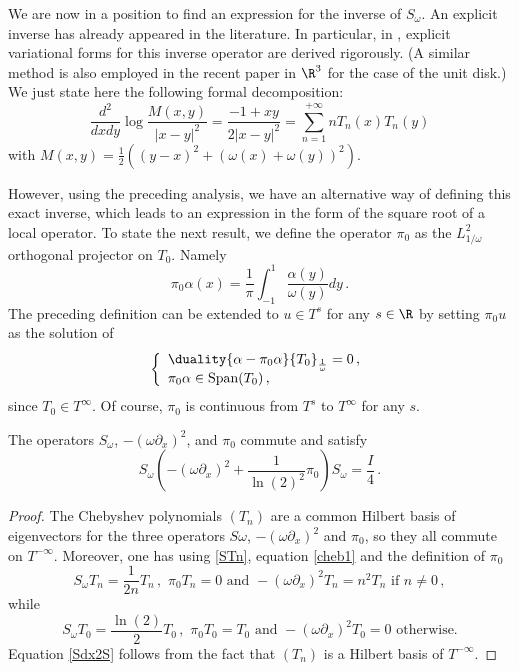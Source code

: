 \documentclass[a4paper]{article}
\begin{document}
	
	We are now in a position to find an expression for the inverse of $S_\omega$. An explicit inverse has already appeared in the literature. In 
	particular, in \cite{jerez2011variational,urzua2014optimal}, explicit variational forms for this inverse operator are derived rigorously. (A similar method is also employed in the recent paper \cite{hiptmair2017closed} in $\R^3$ for the case of the unit disk.) We just state here the following formal decomposition:
	\[\dfrac{d^2}{dxdy}\log\frac{M(x,y)}{|x-y|^2} = \frac{-1+xy}{2|x-y|^2} = \sum_{n=1}^{+ \infty} n T_n(x)T_n(y)\]
	with 
	$M(x,y) = \frac{1}{2}\left((y-x)^2 + (\omega(x) + \omega(y))^2\right) $.
	
	However, using the preceding analysis, we have an alternative way of defining this exact inverse, which leads to an expression in the form of the square root of a local operator. To state the next result, we define the operator $\pi_{0}$ as the $L^2_{1/\omega}$ 
	orthogonal projector on $T_0$. Namely 
	\[\pi_0 \alpha(x)  = \frac{1}{\pi} \int_{-1}^{1}\frac{\alpha(y)}{\omega(y)}dy\,.\]
	The preceding definition can be extended to $u \in T^s$ for any $s \in \R$ by setting $\pi_0 u$ as the solution of
	\[\left\{
	\begin{array}{l}\duality{\alpha-\pi_0 \alpha}{T_0}_{\frac{1}{\omega}} = 0\,,\\
	\pi_0\alpha\in \mbox{Span}(T_0)\,,
	\end{array}
	\right.\]
	since $T_0\in T^\infty$. Of course, $\pi_0$ is continuous from $T^s$ to $T^{\infty}$ for any $s$. 
	
	\begin{The}
		\label{TheSdx2S}
		The operators $S_\omega$, $-(\omega\partial_x)^2$, and $\pi_0$ commute and satisfy
		\begin{equation}
		S_{\omega}\left(-(\omega\partial_x)^2 + \frac{1}{\ln(2)^2} \pi_0 \right)S_{\omega} = \frac{I}{4}\,.
		\label{Sdx2S}
		\end{equation}
	\end{The}
	\begin{proof}
		The Chebyshev polynomials $(T_n)$ are a common Hilbert basis of eigenvectors for the three operators $S\omega$, $-(\omega \partial_x)^2$ and $\pi_0$, so they all commute on $T^{-\infty}$. 
		Moreover, one has using \autoref{STn}, equation \eqref{cheb1} and the definition of $\pi_0$
		\[ S_\omega T_n =\frac{1}{2n}T_n\,,\,\, \pi_0 T_n = 0 \mbox{ and } -(\omega\partial_x)^2T_n = n^2 T_n \mbox{ if } n\ne 0\,,\]
		while
		\[ S_\omega T_0 = \frac{\ln(2)}{2} T_0\,,\,\, \pi_0 T_0 = T_0 \mbox{ and } -(\omega\partial_x)^2T_0 = 0 \mbox{ otherwise.}\]
		Equation \eqref{Sdx2S} follows from the fact that $(T_n)$ is a Hilbert basis of $T^{-\infty}$.
	\end{proof}
	
\end{document}
